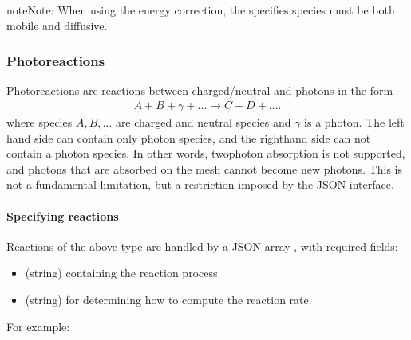 \documentclass[letterpaper,10pt,english]{sphinxmanual}
\begin{document}
\begin{sphinxadmonition}{note}{Note:}
When using the energy correction, the specifies species must be both mobile and diffusive.
\end{sphinxadmonition}


\subsubsection{Photo\sphinxhyphen{}reactions}
\label{\detokenize{Applications/CdrPlasmaModel:photo-reactions}}\label{\detokenize{Applications/CdrPlasmaModel:chap-photoreactionsjson}}
Photo\sphinxhyphen{}reactions are reactions between charged/neutral and photons in the form
\begin{equation*}
\begin{split}A + B + \gamma + \ldots \rightarrow C + D + \ldots.\end{split}
\end{equation*}
where species \(A, B, \ldots\) are charged and neutral species and \(\gamma\) is a photon.
The left hand side can contain only  photon species, and the right\sphinxhyphen{}hand side can not contain a photon species.
In other words, two\sphinxhyphen{}photon absorption is not supported, and photons that are absorbed on the mesh cannot become new photons.
This is not a fundamental limitation, but a restriction imposed by the JSON interface.


\paragraph{Specifying reactions}
\label{\detokenize{Applications/CdrPlasmaModel:id7}}
Reactions of the above type are handled by a JSON array , with required fields:
\begin{itemize}
\item {} 
 (string) containing the reaction process.

\item {} 
 (string) for determining how to compute the reaction rate.

\end{itemize}

For example:

\begin{sphinxVerbatim}[commandchars=\\\{\},formatcom=\scriptsize]
  \PYG{p}{[}
     
  \PYG{p}{]}
\end{sphinxVerbatim}
\end{document}
